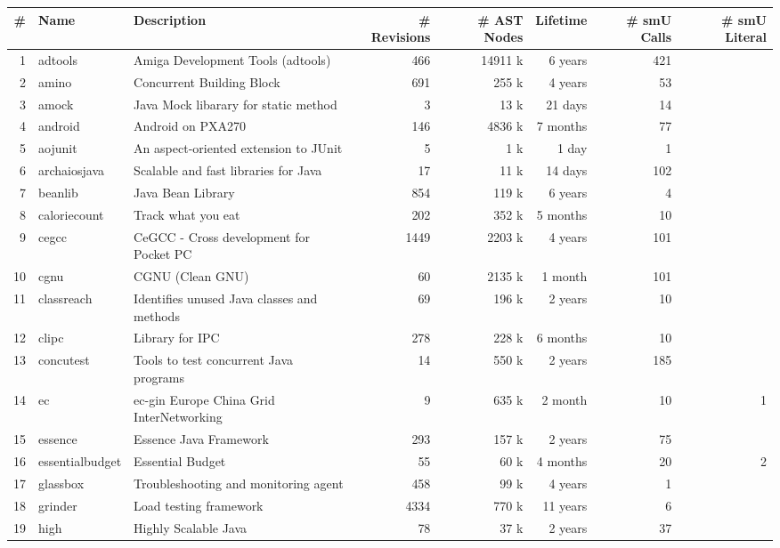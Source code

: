 
\begin{table*}[htb]
\centering
\begin{tabularx}{\textwidth}{|r|l|X|r|r|r|r|r|} \hline    

 \# & Name & Description & \# Revisions & \# AST Nodes & Lifetime & \# smU Calls & \# smU Literal \\ \hline
  1 & adtools & Amiga Development Tools (adtools) & 466 & 14911 k & 6 years  & 421 & \\ 
  2 & amino & Concurrent Building Block & 691 & 255 k & 4 years  &  53 & \\ 
  3 & amock & Java Mock libarary for static method &   3 & 13 k &  21 days &  14 & \\ 
  4 & android & Android on PXA270   & 146 & 4836 k &  7 months  &  77 & \\ 
  5 & aojunit & An aspect-oriented extension to JUnit   &   5 & 1 k & 1 day &   1 & \\ 
  6 & archaiosjava & Scalable and fast libraries for Java  &  17 & 11 k &  14 days & 102 & \\ 
  7 & beanlib & Java Bean Library  & 854 & 119 k & 6 years  &   4 & \\ 
  8 & caloriecount & Track what you eat  & 202 & 352 k &  5 months &  10 & \\ 
  9 & cegcc & CeGCC - Cross development for Pocket PC  & 1449 & 2203 k & 4 years & 101 & \\ 
  10 & cgnu & CGNU (Clean GNU)  &  60 & 2135 k &  1 month & 101 & \\ 
  11 & classreach & Identifies unused Java classes and methods  &  69 & 196 k & 2 years & 10 & \\ 
  12 & clipc & Library for IPC  & 278 & 228 k &  6 months &  10 & \\ 
  13 & concutest & Tools to test concurrent Java programs & 14 & 550 k & 2 years  & 185 & \\ 
  14 & ec & ec-gin Europe China Grid InterNetworking    &   9 & 635 k &  2 month  &  10 & 1 \\ 
  15 & essence & Essence Java Framework    & 293 & 157 k & 2 years &  75 & \\ 
  16 & essentialbudget & Essential Budget   &  55 & 60 k &  4 months &  20 & 2 \\ 
  17 & glassbox & Troubleshooting and monitoring agent  & 458 & 99 k & 4 years &   1 & \\ 
  18 & grinder & Load testing framework  & 4334 & 770 k & 11 years  &   6 & \\ 
  19 & high & Highly Scalable Java   &  78 & 37 k & 2 years &  37 & \\ 

\end{tabularx}
\end{table*}
